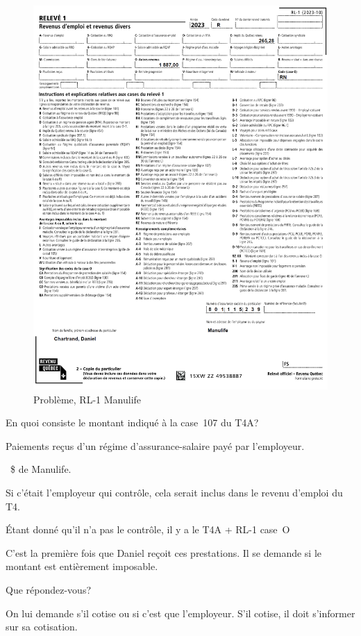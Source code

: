 \begin{figure}
	\centering
	\includegraphics[width=.9\textwidth]{probleme/chapitre-2/RL1-Manulife.png}
	\caption[]{Problème, RL-1 Manulife}
	\label{fig:Chap2RL1Manulife}
\end{figure}


\setcounter{question}{0}
\begin{question}
	En quoi consiste le montant indiqué à la case~107 du T4A?
\end{question}
Paiements reçus d'un régime d'assurance-salaire payé par l'employeur.

~\$ de Manulife.

Si c'était l'employeur qui contrôle, cela serait inclus dans le revenu d'emploi du T4.

Étant donné qu'il n'a pas le contrôle, il y a le T4A + RL-1 case~O

\begin{question}
	C'est la première fois que Daniel reçoit ces prestations. Il se demande si le montant est entièrement imposable. 
	
	Que répondez-vous?
\end{question}
On lui demande s'il cotise ou si c'est que l'employeur. S'il cotise, il doit s'informer sur sa cotisation.

